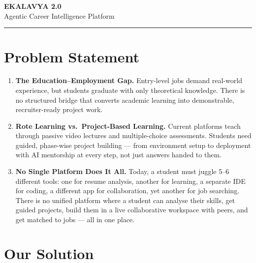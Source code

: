 \documentclass[11pt, a4paper]{article}
\begin{document}
\begin{center}
    {\Huge\bfseries\textcolor{sectionblue}{EKALAVYA 2.0}}\\[4pt]
    {\LARGE\textcolor{ekagray}{Agentic Career Intelligence Platform}}\\[2pt]
    \rule{0.5\textwidth}{0.5pt}
\end{center}

\vspace{6pt}

\section{Problem Statement}

\begin{enumerate}[leftmargin=1.5em, itemsep=2pt, label=\textbf{\arabic*.}]
    \item \textbf{The Education--Employment Gap.} Entry-level jobs demand real-world experience, but students graduate with only theoretical knowledge. There is no structured bridge that converts academic learning into demonstrable, recruiter-ready project work.

    \item \textbf{Rote Learning vs.\ Project-Based Learning.} Current platforms teach through passive video lectures and multiple-choice assessments. Students need guided, phase-wise project building --- from environment setup to deployment with AI mentorship at every step, not just answers handed to them.

    \item \textbf{No Single Platform Does It All.} Today, a student must juggle 5--6 different tools: one for resume analysis, another for learning, a separate IDE for coding, a different app for collaboration, yet another for job searching. There is no unified platform where a student can analyse their skills, get guided projects, build them in a live collaborative workspace with peers, and get matched to jobs --- all in one place.
\end{enumerate}

\section{Our Solution}
\end{document}
